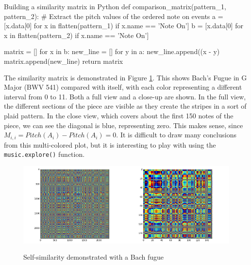 \documentclass{article}
\begin{document}
\begin{sexylisting}{Building a similarity matrix in Python}
def comparison_matrix(pattern_1, pattern_2):
    # Extract the pitch values of the ordered note on events
    a = [x.data[0] for x in flatten(pattern_1) if x.name == 'Note On']
    b = [x.data[0] for x in flatten(pattern_2) if x.name == 'Note On']

    matrix = []
    for x in b:
        new_line = []
        for y in a:
            new_line.append((x - y) %
        matrix.append(new_line)
    return matrix
\end{sexylisting}

The similarity matrix is demonstrated in Figure \ref{fig:fugue-matrix}. This shows Bach's Fugue in G Major (BWV 541) compared with itself, with each color representing a different interval from 0 to 11. Both a full view and a close-up are shown. In the full view, the different sections of the piece are visible as they create the stripes in a sort of plaid pattern. In the close view, which covers about the first 150 notes of the piece, we can see the diagonal is blue, representing zero. This makes sense, since \(M_{i,i} = Pitch(A_i) - Pitch(A_i) = 0\). It is difficult to draw many conclusions from this multi-colored plot, but it is interesting to play with using the \texttt{music.explore()} function.

\begin{figure}[h]
\begin{center}\includegraphics[width=0.5\textwidth]{figure_1.png}\includegraphics[width=0.5\textwidth]{figure_2.png}
\end{center}\caption{Self-similarity demonstrated with a Bach fugue} \label{fig:fugue-matrix}
\end{figure}
\end{document}
